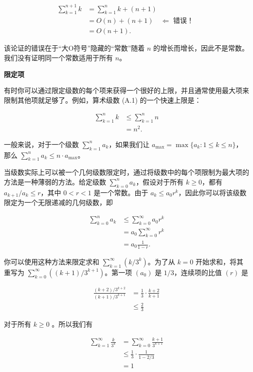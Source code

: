\documentclass[lang=cn,newtx,10pt,scheme=chinese]{elegantbook}
\begin{document}
$$
\begin{aligned}
\sum_{k=1}^{n+1} k & =\sum_{k=1}^n k+(n+1) \\
& =O(n)+(n+1) \quad \Longleftarrow \text { 错误！ } \\
& =O(n+1) .
\end{aligned}
$$

该论证的错误在于“大O符号”隐藏的“常数”随着 $n$ 的增长而增长，因此不是常数。我们没有证明同一个常数适用于所有 $n$。

\textbf{限定项}

有时你可以通过限定级数的每个项来获得一个很好的上限，并且通常使用最大项来限制其他项就足够了。例如，算术级数 (A.1) 的一个快速上限是：

$$
\begin{aligned}
\sum_{k=1}^n k & \leq \sum_{k=1}^n n \\
& =n^2 .
\end{aligned}
$$

一般来说，对于一个级数 $\sum_{k=1}^n a_k$，如果我们让 $a_{\max }=\max \{a_k: 1 \leq k \leq n\}$，那么 $\sum_{k=1}^n a_k \leq n \cdot a_{\max }$。

当级数实际上可以被一个几何级数限定时，通过将级数中的每个项限制为最大项的方法是一种薄弱的方法。给定级数 $\sum_{k=0}^n a_k$，假设对于所有 $k \geq 0$，都有 $a_{k+1} / a_k \leq r$，其中 $0<r<1$ 是一个常数。由于 $a_k \leq a_0 r^k$，因此你可以将该级数限定为一个无限递减的几何级数，即

$$
\begin{aligned}
\sum_{k=0}^n a_k & \leq \sum_{k=0}^{\infty} a_0 r^k \\
& =a_0 \sum_{k=0}^{\infty} r^k \\
& =a_0 \frac{1}{1-r} .
\end{aligned}
$$

你可以使用这种方法来限定求和 $\sum_{k=1}^{\infty}(k / 3^k)$。为了从 $k=0$ 开始求和，将其重写为 $\sum_{k=0}^{\infty}((k+1) / 3^{k+1})$。第一项 $(a_0)$ 是 $1 / 3$，连续项的比值 $(r)$ 是

$$
\begin{aligned}
\frac{(k+2) / 3^{k+2}}{(k+1) / 3^{k+1}} & =\frac{1}{3} \cdot \frac{k+2}{k+1} \\
& \leq \frac{2}{3}
\end{aligned}
$$

对于所有 $k \geq 0$ 。所以我们有

$$
\begin{aligned}
\sum_{k=1}^{\infty} \frac{k}{3^k} & =\sum_{k=0}^{\infty} \frac{k+1}{3^{k+1}} \\
& \leq \frac{1}{3} \cdot \frac{1}{1-2 / 3} \\
& =1
\end{aligned}
$$
\end{document}
